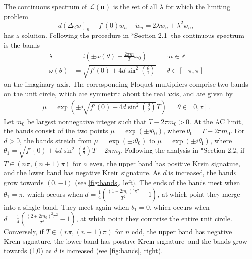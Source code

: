 \documentclass[12pt,reqno]{amsart}
\def\Z{{\mathbb Z}}
\def\calL{\mathcal{L}}
\newcommand{\uvec}{\mathbf{u}}
\theoremstyle{definition}
\begin{document}
The continuous spectrum of $\calL(\uvec)$ is the set of all $\lambda$ for which the limiting problem 
\begin{equation}\label{eq:DKGeigcont}
d (\Delta_2 w)_n - f'(0)w_n - \ddot{w}_n = 2 \lambda \dot{w}_n + \lambda^2 w_n,
\end{equation}
has a solution. Following the procedure in \cite{cuevas-maraver2016}*{Section 2.1}, the continuous spectrum is the bands
\begin{equation}\label{eq:contspec}
\begin{aligned}
\lambda &= i\left( \pm \omega(\theta) - \frac{2 \pi m}{T} \omega_0 \right) && m \in \Z \\
\omega(\theta) &= \sqrt{ f'(0) + 4 d \sin^2\left( \frac{\theta}{2} \right) } && \theta \in [-\pi, \pi]
\end{aligned}
\end{equation}
on the imaginary axis. The corresponding Floquet multipliers comprise two bands on the unit circle,  which are symmetric about the real axis, and are given by
\begin{equation}\label{eq:contspecmult}
\begin{aligned}
\mu = \exp \left( \pm i \sqrt{f'(0) + 4 d \sin^2 \left(\frac{\theta}{2}\right) }T \right)  && \theta \in [0, \pi].
\end{aligned}
\end{equation}
Let $m_0$ be largest nonnegative integer such that $T - 2 \pi m_0 > 0$. At the AC limit, the bands consist of the two points $\mu = \exp(\pm i \theta_0)$, where $\theta_0 =  T - 2 \pi m_0$. For $d>0$, the bands stretch from $\mu = \exp(\pm i \theta_0)$ to $\mu = \exp(\pm i \theta_1)$, where $\theta_1 = \sqrt{f'(0) + 4 d \sin^2 \left(\frac{\theta}{2}\right) }T - 2 \pi m_0$. Following the analysis in \cite{cuevas-maraver2016}*{Section 2.2}, if $T \in (n \pi, (n+1)\pi)$ for $n$ even, the upper band has positive Krein signature, and the lower band has negative Krein signature. As $d$ is increased, the bands grow towards $(0,-1)$ (see \cref{fig:bands}, left). The ends of the bands meet when $\theta_1 = \pi$, which occurs when $d = \frac{1}{4} \left( \frac{(1 + 2 m_0)^2 \pi^2}{T^2} - 1\right)$, at which point they merge into a single band. They meet again when $\theta_1 = 0$, which occurs when $d = \frac{1}{4} \left( \frac{(2 + 2 m_0)^2 \pi^2}{T^2} - 1\right)$, at which point they comprise the entire unit circle.
Conversely, if $T \in (n \pi, (n+1)\pi)$ for $n$ odd, the upper band has negative Krein signature, the lower band has positive Krein signature, and the bands grow towards (1,0) as $d$ is increased (see \cref{fig:bands}, right).
\end{document}
